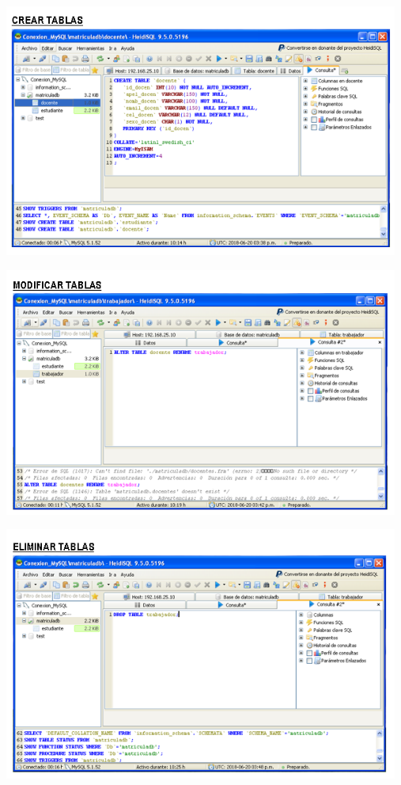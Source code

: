 \begin{itemize}
	\begin{center}
		\includegraphics[width=13cm]{./Imagenes/24a}
		\end{center}
\end{itemize} 

\begin{itemize}
	\begin{center}
		\includegraphics[width=13cm]{./Imagenes/25a}
		\end{center}
\end{itemize} 

\begin{itemize}
	\begin{center}
		\includegraphics[width=13cm]{./Imagenes/26a}
		\end{center}
\end{itemize} 

